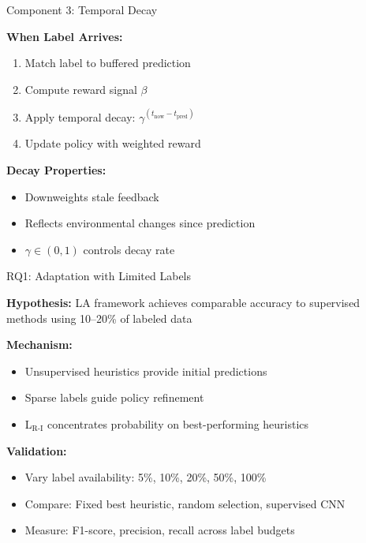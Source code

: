 \documentclass[10pt,xcolor={table,dvipsnames},t]{beamer}
\begin{document}
\begin{frame}{Component 3: Temporal Decay}

\textbf{When Label Arrives:}
\begin{enumerate}
  \item Match label to buffered prediction
  \item Compute reward signal $\beta$
  \item Apply temporal decay: $\gamma^{(t_{\text{now}} - t_{\text{pred}})}$
  \item Update policy with weighted reward
\end{enumerate}

\vspace{0.5em}
\textbf{Decay Properties:}
\begin{itemize}
  \item Downweights stale feedback
  \item Reflects environmental changes since prediction
  \item $\gamma \in (0, 1)$ controls decay rate
\end{itemize}

\end{frame}

\begin{frame}{RQ1: Adaptation with Limited Labels}

\textbf{Hypothesis:} LA framework achieves comparable accuracy to supervised methods using 10--20\% of labeled data

\vspace{0.5em}
\textbf{Mechanism:}
\begin{itemize}
  \item Unsupervised heuristics provide initial predictions
  \item Sparse labels guide policy refinement
  \item L$_{\text{R-I}}$ concentrates probability on best-performing heuristics
\end{itemize}

\vspace{0.5em}
\textbf{Validation:}
\begin{itemize}
  \item Vary label availability: 5\%, 10\%, 20\%, 50\%, 100\%
  \item Compare: Fixed best heuristic, random selection, supervised CNN
  \item Measure: F1-score, precision, recall across label budgets
\end{itemize}

\end{frame}
\end{document}
